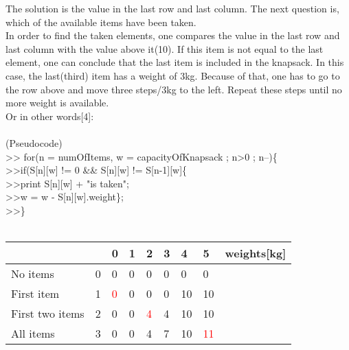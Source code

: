 The solution is the value in the last row and last column. The next question is, which of the available items have been taken.\\
In order to find the taken elements, one compares the value in the last row and last column with the value above it(10). If this item is not equal to the last element, one can conclude that the last item is included in the knapsack. In this case, the last(third) item has a weight of 3kg. Because of that, one has to go to the row above and move three steps/3kg to the left. Repeat these steps until no more weight is available.\\
Or in other words[4]:\\\\
(Pseudocode)\\
>> for(n = numOfItems, w = capacityOfKnapsack ; n>0 ; n--)\{\\
>>\tab if(S[n][w] != 0 && S[n][w] != S[n-1][w]\{\\
>>\tab \tab print S[n][w] + "is taken";\\
>>\tab \tab w = w - S[n][w].weight\};\\
>>\tab \}\\\\
\begin{tabular}{l|l|l|l|l|l|l|l|l}
                &   & 0 & 1 & 2 & 3 & 4 & 5 & weights{[}kg{]} \\ \hline
No items        & 0 & 0 & 0 & 0  & 0  & 0  & 0  &                 \\
First item      & 1 & \textcolor{red}{0}  & 0 & 0 & 0 & 10 & 10 &   \\
First two items & 2 & 0 & 0 & \textcolor{red}{4} & 4 & 10 & 10 &  \\
All items       & 3 & 0 & 0 & 4 & 7 & 10 & \textcolor{red}{11}  &                
\end{tabular}\\\\

